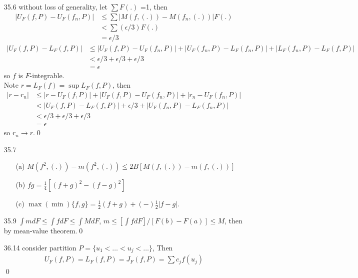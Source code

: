 \documentclass[paper=a4, fontsize=11pt]{scrartcl} %
\numberwithin{equation}{section} %
\numberwithin{figure}{section} %
\numberwithin{table}{section} %
\begin{document}
\begin{itemize}
\begin{itemize}
	\item[(b)] consider $f-f_n$, apply (a).\qed
	\end{itemize}
\item[35.6] without loss of generality, let $\sum F(.)$ =1, then
\begin{align}
	|U_F(f,P)- U_F(f_n, P)| &\leq \sum |M(f,(.)) - M(f_n,(.))| F(.) \\
	&< \sum (\epsilon/3) F(.) \\
	&= \epsilon/3
\end{align} 
\begin{align}
	|U_F(f,P) - L_F(f,P)| &\leq |U_F(f,P)- U_F(f_n, P)| + |U_F(f_n,P) - L_F(f_n,P)| + |L_F(f_n,P)-L_F(f,P)| \\
	&< \epsilon/3 + \epsilon/3 +\epsilon/3 \\
	&= \epsilon
\end{align}
so $f$ is $F$-integrable.\\
Note $r=L_F(f)=\sup L_F(f,P)$, then
\begin{align}
|r-r_n| &\leq |r-U_F(f,P)| + |U_F(f,P) - U_F(f_n,P)| + |r_n - U_F(f_n,P)| \\
	&< |U_F(f,P) - L_F(f,P)| + \epsilon/3 + |U_F(f_n,P) - L_F(f_n,P)| \\
	&< \epsilon/3 + \epsilon/3 +\epsilon/3 \\
	&= \epsilon
\end{align}
so $r_n \rightarrow r$.\qed
\item[35.7] \begin{itemize}
	\item[(a)] $M(f^2,(.)) - m(f^2,(.)) \leq 2B [M(f,(.)) - m(f,(.))]$
	\item[(b)] $fg = \frac{1}{4}[(f+g)^2 -(f-g)^2]$
	\item[(c)] $\max(\min)\{f,g\} = \frac{1}{2} (f+g) +(-) \frac{1}{2}|f-g|$.
	\end{itemize}
\item[35.9] $\int mdF\leq \int fdF \leq \int MdF$, $m\leq [\int fdF]/[F(b)-F(a)] \leq M$, then by mean-value theorem.\qed
\item[36.14] consider partition $P=\{u_1<\dots<u_j<\dots\}$, Then
	\begin{align}
		U_F(f,P) = L_F(f,P) = J_F(f, P) = \sum c_j f(u_j)
	\end{align}\qed
\end{itemize}
\end{document}
